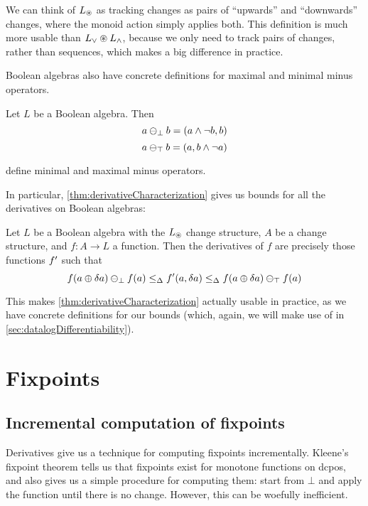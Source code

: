 We can think of $L_\circledast$ as tracking changes as pairs of ``upwards'' and
``downwards'' changes, where the monoid action simply applies both. This
definition is much more usable than $L_\vee \circledast L_\wedge$, because we
only need to track pairs of changes, rather than sequences, which makes a big
difference in practice.

Boolean algebras also have concrete definitions for maximal and minimal minus
operators.

\begin{prop}
  Let $L$ be a Boolean algebra. Then
  $$a \ominus_\bot b = (a \wedge \neg b, b)$$
  $$a \ominus_\top b = (a, b \wedge \neg a)$$

  define minimal and maximal minus operators.
\end{prop}

In particular, \cref{thm:derivativeCharacterization} gives us bounds for
all the derivatives on Boolean algebras:

\begin{corollary}
\label{cor:booleanCharacterization}
  Let $L$ be a Boolean algebra with the $L_\circledast$ change structure, $A$ be
  a change structure, and $f: A \rightarrow
  L$ a function. Then the derivatives of $f$ are precisely those functions
  $f'$ such that
  $$
  f(a \oplus \delta a) \ominus_\bot f(a)
  \leq_\Delta
  f'(a, \delta a)
  \leq_\Delta
  f(a \oplus \delta a) \ominus_\top f(a)
  $$
\end{corollary}

This makes \cref{thm:derivativeCharacterization} actually usable in practice, as
we have concrete definitions for our bounds (which, again, we will make use of in \cref{sec:datalogDifferentiability}).

\section{Fixpoints}
\label{sec:fixpoints}

\subsection{Incremental computation of fixpoints}

Derivatives give us a technique for computing fixpoints incrementally. Kleene's
fixpoint theorem tells us that fixpoints exist for monotone functions on dcpos, and also gives us
a simple procedure for computing them: start from $\bot$ and apply the function
until there is no change. However, this can be woefully inefficient.


